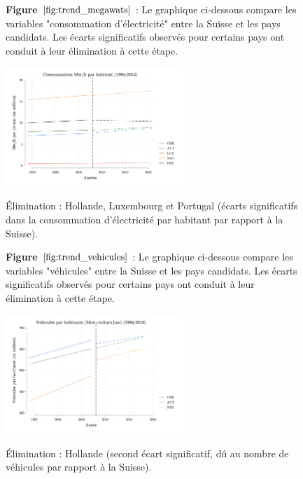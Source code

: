 
        \begin{figure}[H]
\textbf{Figure {$\ref{fig:trend_megawats}$}} : Le graphique ci-dessous compare les variables "consommation d'électricité" entre la Suisse et les pays candidats. Les écarts significatifs observés pour certains pays ont conduit à leur élimination à cette étape.


        \centering
        \includegraphics[width=0.6\textwidth]{Article/images/trend_electricite.png}
        \caption{}
        \label{fig:trend_megawats}
\begin{center}
Élimination : Hollande, Luxembourg et Portugal (écarts significatifs dans la consommation d'électricité par habitant par rapport à la Suisse).
\end{center}
    \end{figure}

    



\begin{figure}[H]
\textbf{Figure {$\ref{fig:trend_vehicules}$}} : Le graphique ci-dessous compare les variables "véhicules" entre la Suisse et les pays candidats. Les écarts significatifs observés pour certains pays ont conduit à leur élimination à cette étape.


\centering
\includegraphics[width=0.6\textwidth]{Article/images/trend_vehicules.png}
\caption{}
\label{fig:trend_vehicules}
\begin{center}
    Élimination : Hollande (second écart significatif, dû au nombre de véhicules par rapport à la Suisse).
\end{center}
\end{figure}




